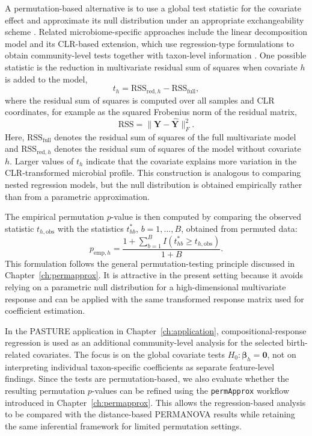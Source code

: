A permutation-based alternative is to use a global test statistic for the covariate effect and approximate its null distribution under an appropriate exchangeability scheme \citep{freedman1983nonstochastic,winkler2014permutation}. Related microbiome-specific approaches include the linear decomposition model and its CLR-based extension, which use regression-type formulations to obtain community-level tests together with taxon-level information \citep{hu2020testing,hu2023compositional}. One possible statistic is the reduction in multivariate residual sum of squares when covariate $h$ is added to the model,
\begin{equation}
t_h=\mathrm{RSS}_{\mathrm{red},h}-\mathrm{RSS}_{\mathrm{full}},
\end{equation}
where the residual sum of squares is computed over all samples and CLR coordinates, for example as the squared Frobenius norm of the residual matrix,
\begin{equation}
\mathrm{RSS}=\|\mathbf{Y}-\widehat{\mathbf{Y}}\|_F^2.
\end{equation}
Here, $\mathrm{RSS}_{\mathrm{full}}$ denotes the residual sum of squares of the full multivariate model and $\mathrm{RSS}_{\mathrm{red},h}$ denotes the residual sum of squares of the model without covariate $h$. Larger values of $t_h$ indicate that the covariate explains more variation in the CLR-transformed microbial profile. This construction is analogous to comparing nested regression models, but the null distribution is obtained empirically rather than from a parametric approximation.

The empirical permutation $p$-value is then computed by comparing the observed statistic $t_{h,\mathrm{obs}}$ with the statistics $t_{hb}^\ast$, $b=1,\ldots,B$, obtained from permuted data:
\begin{equation}
p_{\mathrm{emp},h}=\frac{1+\sum_{b=1}^B I(t_{hb}^\ast\geq t_{h,\mathrm{obs}})}{1+B}.
\end{equation}
This formulation follows the general permutation-testing principle discussed in Chapter~\ref{ch:permapprox}. It is attractive in the present setting because it avoids relying on a parametric null distribution for a high-dimensional multivariate response and can be applied with the same transformed response matrix used for coefficient estimation.

In the PASTURE application in Chapter~\ref{ch:application}, compositional-response regression is used as an additional community-level analysis for the selected birth-related covariates. The focus is on the global covariate tests $H_0:\boldsymbol{\beta}_h=\mathbf{0}$, not on interpreting individual taxon-specific coefficients as separate feature-level findings. Since the tests are permutation-based, we also evaluate whether the resulting permutation $p$-values can be refined using the \texttt{permApprox} workflow introduced in Chapter~\ref{ch:permapprox}. This allows the regression-based analysis to be compared with the distance-based PERMANOVA results while retaining the same inferential framework for limited permutation settings.


